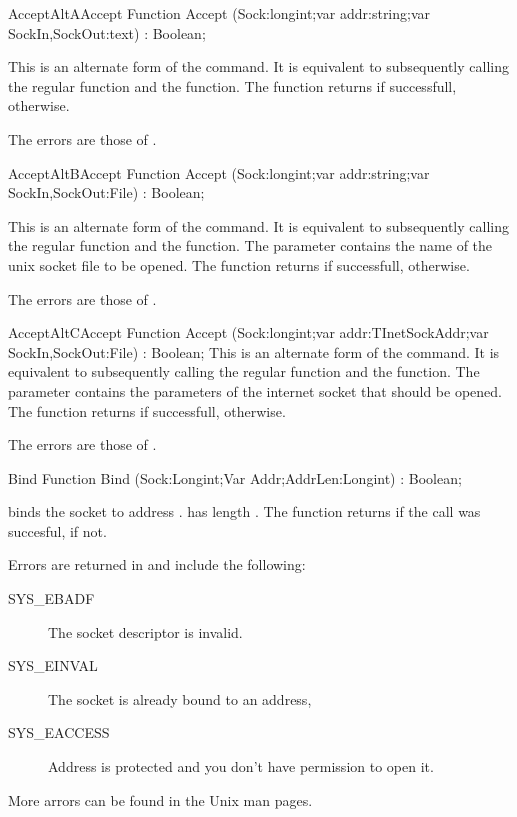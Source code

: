 \begin{functionl}{Accept}{AltAAccept}
\Declaration
Function Accept (Sock:longint;var addr:string;var SockIn,SockOut:text) : Boolean;

\Description
This is an alternate form of the  command. It is equivalent
to subsequently calling the regular 
function and the  function.
The function returns  if successfull,  otherwise.

\Errors
The errors are those of .
\SeeAlso
{}
\end{functionl}
\begin{functionl}{Accept}{AltBAccept}
\Declaration
Function Accept (Sock:longint;var addr:string;var SockIn,SockOut:File) : Boolean;

\Description
 This is an alternate form of the  command. 
It is equivalent
to subsequently calling the regular  function and the 
 function.
The  parameter contains the name of the unix socket file to be
opened. 
The function returns  if successfull,  otherwise.

\Errors
The errors are those of .
\SeeAlso
{}
\end{functionl}
\begin{functionl}{Accept}{AltCAccept}
\Declaration
Function Accept (Sock:longint;var addr:TInetSockAddr;var SockIn,SockOut:File) : Boolean;
\Description
 This is an alternate form of the  command. 
It is equivalent
to subsequently calling the regular  function and the 
 function.
The  parameter contains the parameters of the internet socket that
should be opened.
The function returns  if successfull,  otherwise.

\Errors
The errors are those of .
\SeeAlso
{}
\end{functionl}
\begin{function}{Bind}
\Declaration
Function Bind (Sock:Longint;Var Addr;AddrLen:Longint) : Boolean;

\Description
{} binds the socket  to address . 
has length .
The function returns  if the call was succesful,  if
not.

\Errors
Errors are returned in  and include the following:
\begin{description}
\item[SYS\_EBADF] The socket descriptor is invalid.
\item[SYS\_EINVAL] The socket is already bound to an address,
\item[SYS\_EACCESS] Address is protected and you don't have permission to
open it.
\end{description}
More arrors can be found in the Unix man pages.

\SeeAlso
{}
\end{function}
